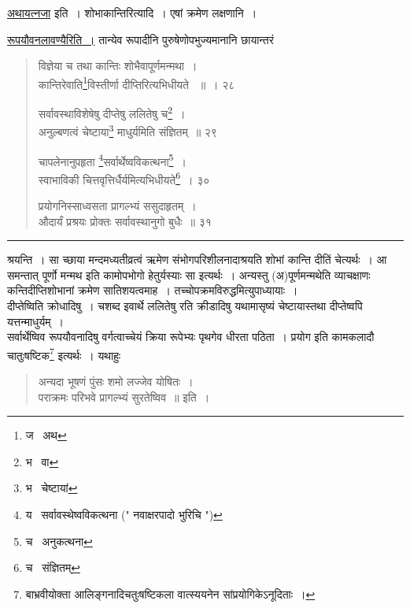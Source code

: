 \documentclass[11pt, openany]{book}
\begin{document}
 \underline{अथायत्नजा} इति~। शोभाकान्तिरित्यादि~। एषां क्रमेण लक्षणानि~। 

\underline{रूपयौवनलावण्यैरिति~।} तान्येव रूपादीनि पुरुषेणोपभुज्यमानानि छायान्तरं 

\newpage
 
 \begin{quote}
 {\na विज्ञेया च तथा कान्तिः शोभैवापूर्णमन्मथा~। \\
 कान्तिरेवाति\renewcommand{\thefootnote}{1}\footnote{ज \textendash\ अथ }विस्तीर्णा दीप्तिरित्यभिधीयते ~॥~। २८ 

 सर्वावस्थाविशेषेषु दीप्तेषु ललितेषु च\renewcommand{\thefootnote}{2}\footnote{भ \textendash\ वा }~। \\
 अनुल्बणत्वं चेष्टाया\renewcommand{\thefootnote}{3}\footnote{भ \textendash\ चेष्टायां} माधुर्यमिति संज्ञितम्~॥ २९ 

 चापलेनानुपहृता \renewcommand{\thefootnote}{4}\footnote{य \textendash\ सर्वावस्थेष्वविकत्थना (" नवाक्षरपादो भुरिचि ") }सर्वार्थेष्वविकत्थना\renewcommand{\thefootnote}{5}\footnote{च \textendash\ अनुकत्थना}~। \\
 स्वाभाविकी चित्तवृत्तिर्धैर्यमित्यभिधीयते\renewcommand{\thefootnote}{6}\footnote{च \textendash\ संज्ञितम्}~। ३० 

 प्रयोगनिस्साध्वसता प्रागल्भ्यं ससुदाहृतम्~। \\
 औदार्यं प्रश्रयः प्रोक्तः सर्वावस्थानुगो बुधैः~॥ ३१ }
 \end{quote}
 
\hrule

\vspace{2mm}

\noindent
श्रयन्ति~। सा च्छाया मन्दमध्यतीव्रत्वं ऋमेण संभोगपरिशीलनादाश्रयति शोभां कान्ति दीतिं चेत्यर्थः~। आ समन्तात् पूर्णो मन्मथ इति कामोपभोगो हेतुर्यस्याः सा इत्यर्थः~। अन्यस्तु (अ)पूर्णमन्मथेति व्याचक्षाणः कन्तिदीप्तिशोभानां क्रमेण सातिशयत्वमाह~। तच्चोपक्रमविरुद्धमित्युपाध्यायाः~। \\

दीप्तेष्विति क्रोधादिषु~। चशब्द इवार्थे ललितेषु रति क्रीडादिषु यथामासृष्यं चेष्टायास्तथा दीप्तेष्वपि यत्तन्माधुर्यम्~। \\

सर्वार्थेष्विव रूपयौवनादिषु वर्गत्वाच्चेयं क्रिया रूपेभ्यः पृथगेव धीरता पठिता~। प्रयोग इति कामकलादौ चातुःषष्टिक\renewcommand{\thefootnote}{*}\footnote{बाभ्रवीयोक्ता आलिङ्गनादिचतुःषष्टिकला वात्स्ययनेन सांप्रयोगिकेऽनूदिताः~। } 
 इत्यर्थः~। यथाहुः\textendash\ 

\begin{quote}
 {\qt अन्यदा भूषणं पुंसः शमो लज्जेव योषितः~। \\
पराक्रमः परिभवे प्रागल्भ्यं सुरतेष्विव~॥ इति~। }
\end{quote}
\end{document}
